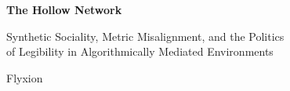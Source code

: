 \documentclass[12pt,a4paper]{article}
\begin{document}
\begin{titlepage}
\centering
\vspace*{3cm}
{\LARGE\bfseries The Hollow Network\par}
\vspace{1em}
{\large Synthetic Sociality, Metric Misalignment, and the Politics\\[0.3em]
of Legibility in Algorithmically Mediated Environments\par}
\vspace{2em}
{\large Flyxion\par}
\vfill
\end{titlepage}

\setcounter{page}{1}
\end{document}

